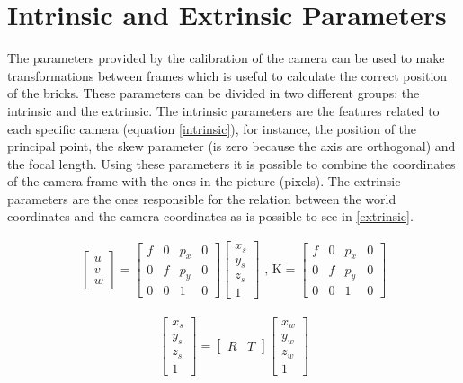\section{Intrinsic and Extrinsic Parameters}
The parameters provided by the calibration of the camera can be used to make transformations between frames which is useful to calculate the correct position of the bricks. These parameters can be divided in two different groups: the intrinsic and the extrinsic. The intrinsic parameters are the features related to each specific camera (equation \ref{intrinsic}), for instance, the position of the principal point, the skew parameter (is zero because the axis are orthogonal) and the focal length. Using these parameters it is possible to combine the coordinates of the camera frame with the ones in the picture (pixels). The extrinsic parameters are the ones responsible for the relation between the world coordinates and the camera coordinates as is possible to see in \ref{extrinsic}.

\begin{align} 
\label{intrinsic}
\begin{bmatrix}
    \textit{u} \\ 
    \textit{v} \\
    \textit{w} 
\end{bmatrix}
=
\begin{bmatrix}
    \textit{f}  & 0 & p_{x} & 0\\
    0   &  \textit{f} & p_{y} & 0  \\
    0 & 0 & 1 & 0 
\end{bmatrix}
\begin{bmatrix}
   x_{s}\\
   y_{s}\\
   z_{s}\\
	1
\end{bmatrix}
\text{  , K}
=
\begin{bmatrix}
    \textit{f}  & 0 & p_{x} & 0\\
    0   &  \textit{f} & p_{y} & 0  \\
    0 & 0 & 1 & 0 
\end{bmatrix}
\end{align}

\begin{align} 
\label{extrinsic}
\begin{bmatrix}
   x_{s}\\
   y_{s}\\
   z_{s}\\
	1
\end{bmatrix}
=
\begin{bmatrix}
    \textit{R}  & \textit{T}
\end{bmatrix}
\begin{bmatrix}
   x_{w}\\
   y_{w}\\
   z_{w}\\
	1
\end{bmatrix}
\end{align}

